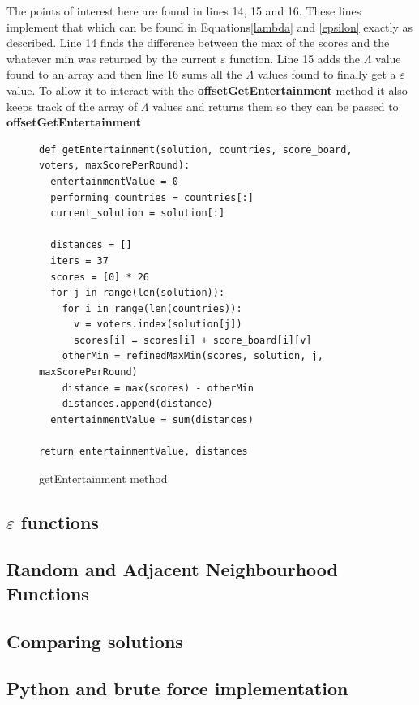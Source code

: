\documentclass[12pt]{report}
\begin{document}
The points of interest here are found in lines 14, 15 and 16. These lines implement that which can be found in Equations\ref{lambda} and \ref{epsilon} exactly as described. Line 14 finds the difference between the max of the scores and the whatever min was returned by the current $\varepsilon$ function. Line 15 adds the $\Lambda$ value found to an array and then line 16 sums all the $\Lambda$ values found to finally get a $\varepsilon$ value. To allow it to interact with the \textbf{offsetGetEntertainment} method it also keeps track of the array of $\Lambda$ values and returns them so they can be passed to \textbf{offsetGetEntertainment} 
\begin{figure}[H]
\caption{getEntertainment method}
\label{getEntertainment}
\begin{lstlisting}
def getEntertainment(solution, countries, score_board, voters, maxScorePerRound):
  entertainmentValue = 0
  performing_countries = countries[:]
  current_solution = solution[:]
    
  distances = []
  iters = 37
  scores = [0] * 26
  for j in range(len(solution)):
    for i in range(len(countries)):
      v = voters.index(solution[j])
      scores[i] = scores[i] + score_board[i][v]
    otherMin = refinedMaxMin(scores, solution, j, maxScorePerRound)
    distance = max(scores) - otherMin
    distances.append(distance)
  entertainmentValue = sum(distances)
  
return entertainmentValue, distances
\end{lstlisting}
\end{figure}


\subsection{$\varepsilon$ functions}

\subsection{Random and Adjacent Neighbourhood Functions}\label{Imp-Neighbours}
\subsection{Comparing solutions}\label{Imp-Solutions}
\subsection{Python and brute force implementation}\label{Imp-Python}
\end{document}
